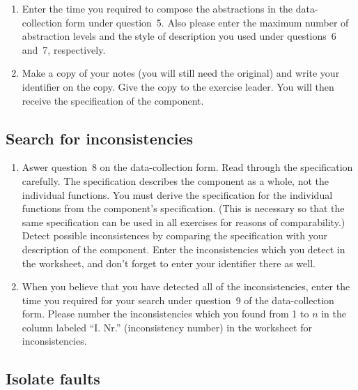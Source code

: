 \begin{enumerate}
\item Enter the time you required to compose the abstractions 
in the data-collection form under question~5.
Also please enter the maximum number of abstraction levels and the
style of description you used under questions~6 and~7, respectively.

\item Make a copy of your notes (you will still need the original) and
write your identifier on the copy.  Give the copy to the exercise
leader.  You will then receive the specification of the component.

\end{enumerate}

\subsection*{Search for inconsistencies}

\begin{enumerate}
\addtocounter{enumi}{8}

\item Aswer question~8 on the data-collection form.
Read through the specification carefully.  The specification describes
the component as a whole, not the individual functions.  You must
derive the specification for the individual functions from the 
component's specification. 
(This is necessary so that the same specification can be used in all
exercises for reasons of comparability.)
Detect possible inconsistences by comparing the specification with your
description of the component.
Enter the inconsistencies which you detect in the worksheet, and don't
forget to enter your identifier there as well.   

\item When you believe that you have detected all of the
inconsistencies, enter the time you required for your search under
question~9 of the data-collection form.
Please number the inconsistencies which you found from 1 to $n$ in the
column labeled ``I. Nr.'' (inconsistency number) in the worksheet for
inconsistencies. 

\end{enumerate}

\subsection*{Isolate faults}

